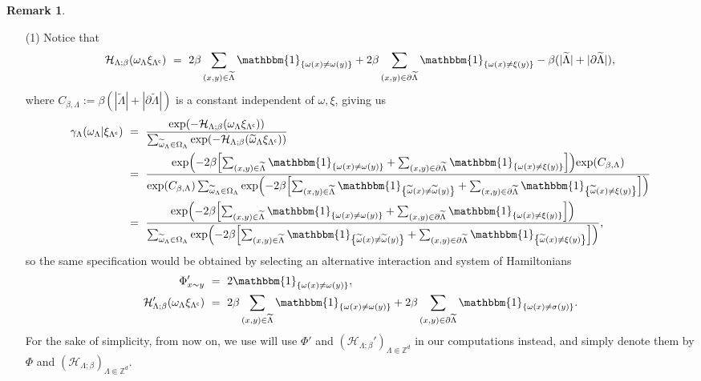 \documentclass[12pt]{article}
\renewcommand{\H}{\mathcal{H}}
\newcommand{\Z}{\mathbb{Z}}
\newcommand{\set}[1]{\left\{#1\right\}}
\newcommand{\oklepaj}[1]{\left(#1\right)}
\newcommand{\oglati}[1]{\left[#1\right]}
\newcommand{\1}{\mathbbm{1}}
\renewcommand{\c}{\mathsf{c}}
\newcommand{\5}{\vspace{0.5cm}}
\renewcommand{\tilde}{\widetilde}
\theoremstyle{definition}
\newtheorem{rem}[thm]{Remark}
\begin{document}
\begin{rem}
\begin{itemize}
	\item[(1)] Notice that $$\H_{\Lambda;\beta}(\omega_{\Lambda}\xi_{\Lambda^\c}) ~=~ 2\beta\sum_{(x,y)\in\tilde{\Lambda}}\1_{\set{\omega(x)\neq\omega(y)}} + 2\beta\sum_{(x,y)\in\partial\tilde{\Lambda}}\1_{\set{\omega(x)\neq\xi(y)}}-\beta(|\tilde{\Lambda}|+|\partial\tilde{\Lambda}|),$$
	where $C_{\beta,\Lambda}:=\beta(|\tilde{\Lambda}|+|\partial\tilde{\Lambda}|)$ is a  constant independent of $\omega,\xi$, giving us
	\begin{align*}
	\gamma_{\Lambda}(\omega_{\Lambda}|\xi_{\Lambda^\c}) ~&=~ \frac{\exp(-\H_{\Lambda;\beta}(\omega_{\Lambda}\xi_{\Lambda^\c}))}{\sum_{\tilde{\omega}_{\Lambda}\in\Omega_{\Lambda}}\exp(-\H_{\Lambda;\beta}(\tilde{\omega}_{\Lambda}\xi_{\Lambda^\c}))} \\
	&=~ \frac{\exp\!\oklepaj{-2\beta\!\oglati{\sum_{(x,y)\in\tilde{\Lambda}}\1_{\set{\omega(x)\neq\omega(y)}} + \sum_{(x,y)\in\partial\tilde{\Lambda}}\1_{\set{\omega(x)\neq\xi(y)}}}}\!\exp(C_{\beta,\Lambda})}{\exp(C_{\beta,\Lambda})\sum_{\tilde{\omega}_{\Lambda}\in\Omega_{\Lambda}}\exp\!\oklepaj{-2\beta\!\oglati{\sum_{(x,y)\in\tilde{\Lambda}}\1_{\set{\tilde{\omega}(x)\neq\tilde{\omega}(y)}} + \sum_{(x,y)\in\partial\tilde{\Lambda}}\1_{\set{\tilde{\omega}(x)\neq\xi(y)}}}}} \\
	&=~ \frac{\exp\!\oklepaj{-2\beta\!\oglati{\sum_{(x,y)\in\tilde{\Lambda}}\1_{\set{\omega(x)\neq\omega(y)}} + \sum_{(x,y)\in\partial\tilde{\Lambda}}\1_{\set{\omega(x)\neq\xi(y)}}}}}{\sum_{\tilde{\omega}_{\Lambda}\in\Omega_{\Lambda}}\exp\!\oklepaj{-2\beta\!\oglati{\sum_{(x,y)\in\tilde{\Lambda}}\1_{\set{\tilde{\omega}(x)\neq\tilde{\omega}(y)}} + \sum_{(x,y)\in\partial\tilde{\Lambda}}\1_{\set{\tilde{\omega}(x)\neq\xi(y)}}}}},
	\end{align*}
	so the same specification would be obtained by selecting an alternative interaction and system of Hamiltonians
	\begin{align*}
	\Phi_{x\sim y}' ~&=~ 2\1_{\set{\omega(x)\neq\omega(y)}}, \\
	\H_{\Lambda;\beta}'(\omega_{\Lambda}\xi_{\Lambda^\c}) ~&=~ 2\beta\sum_{(x,y)\in\tilde{\Lambda}}\1_{\set{\omega(x)\neq\omega(y)}}+2\beta\sum_{(x,y)\in\partial\tilde{\Lambda}}\1_{\set{\omega(x)\neq\sigma(y)}}.
	\end{align*}
	For the sake of simplicity, from now on, we use will use $\Phi'$ and $(\H_{\Lambda;\beta}')_{\Lambda\Subset\Z^d}$ in our computations instead, and simply denote them by $\Phi$ and $(\H_{\Lambda;\beta})_{\Lambda\Subset\Z^d}$.

\end{itemize}
\end{rem}
\end{document}
